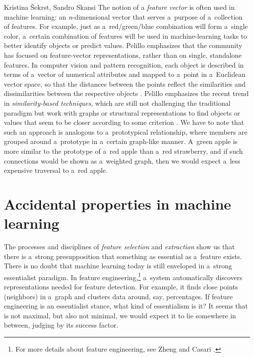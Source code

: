 \begin{artengenv2auth}{Kristina Šekrst, Sandro Skansi}
The notion of a \textit{feature vector} is often used in machine learning: an \textit{n}-dimensional vector that serves a~purpose of a~collection of features. For example, just as a~red/green/blue combination will form a~single color, a~certain combination of features will be used in machine-learning tasks to better identify objects or predict values. Pelillo
\parencite*[][p.3]{pelillo_introduction_2013} %
 emphasizes that the community has focused on feature-vector representations, rather than on single, standalone features. In computer vision and pattern recognition, each object is described in terms of a~vector of numerical attributes and mapped to a~point in a~Euclidean vector space, so that the distances between the points reflect the similarities and dissimilarities between the respective objects 
\parencite[][p.3]{pelillo_introduction_2013}. %
 Pelillo emphasizes the recent trend in \textit{similarity-based techniques}, which are still not challenging the traditional paradigm but work with graphs or structural representations to find objects or values that seem to be closer according to some criterion 
\parencite[][p.4]{pelillo_introduction_2013}. %
 We have to note that such an approach is analogous to a~prototypical relationship, where members are grouped around a~prototype in a~certain graph-like manner. A~green apple is more similar to the prototype of a~red apple than a~red strawberry, and if such connections would be shown as a~weighted graph, then we would expect a~less expensive traversal to a~red apple.

\section*{Accidental properties in machine learning}
The processes and disciplines of \textit{feature selection} and \textit{extraction} show us that there is a~strong presupposition that something as essential as a~feature exists. There is no doubt that machine learning today is still enveloped in a~strong essentialist paradigm. In feature engineering,\footnote{For more details about feature engineering, see Zheng and Casari
\parencite*[][]{zheng_feature_2018}.%
} a~system automatically discovers representations needed for feature detection. For example, it finds close points (neighbors) in a~graph and clusters data around, say, percentages. If feature engineering is an essentialist stance, what kind of essentialism is it? It seems that is not maximal, but also not minimal, we would expect it to lie somewhere in between, judging by its success factor.


\end{artengenv2auth}
